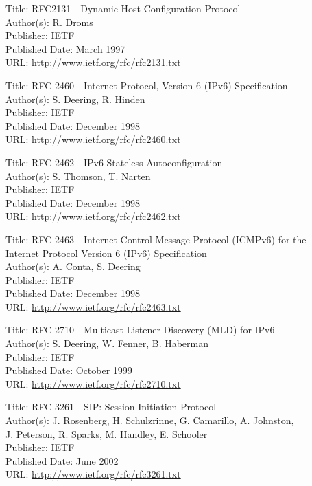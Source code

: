 \documentclass[a4paper,12pt]{article}
\begin{document}
Title: RFC2131 - Dynamic Host Configuration Protocol \\
Author(s): R. Droms \\
Publisher: IETF \\
Published Date: March 1997 \\
URL: \url{http://www.ietf.org/rfc/rfc2131.txt}	 

Title: RFC 2460 - Internet Protocol, Version 6 (IPv6) Specification \\
Author(s): S. Deering, R. Hinden \\
Publisher: IETF \\
Published Date: December 1998 \\
URL: \url{http://www.ietf.org/rfc/rfc2460.txt}	 

Title: RFC 2462 - IPv6 Stateless Autoconfiguration \\
Author(s): S. Thomson, T. Narten \\
Publisher: IETF \\
Published Date: December 1998\\
URL: \url{http://www.ietf.org/rfc/rfc2462.txt}	 

Title: RFC 2463 - Internet Control Message Protocol (ICMPv6) for the \\
\hspace{15mm} Internet Protocol Version 6 (IPv6) Specification \\
Author(s): A. Conta, S. Deering \\
Publisher: IETF \\
Published Date: December 1998 \\
URL: \url{http://www.ietf.org/rfc/rfc2463.txt}	 

Title: RFC 2710 - Multicast Listener Discovery (MLD) for IPv6 \\
Author(s): S. Deering, W. Fenner, B. Haberman \\
Publisher: IETF \\
Published Date: October 1999 \\
URL: \url{http://www.ietf.org/rfc/rfc2710.txt}	 

Title: RFC 3261 - SIP: Session Initiation Protocol \\
Author(s): J. Rosenberg, H. Schulzrinne, G. Camarillo, A. Johnston, \\
\hspace{15mm} J. Peterson, R. Sparks, M. Handley, E. Schooler \\
Publisher: IETF \\
Published Date: June 2002  \\
URL: \url{http://www.ietf.org/rfc/rfc3261.txt}	 
\end{document}
